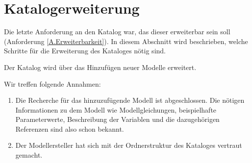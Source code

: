 \section{Katalogerweiterung}
\label{Ch:Ergebnisse:Sec:Erweiterung}
Die letzte Anforderung an den Katalog war, das dieser erweiterbar sein soll (Anforderung \ref{A.Erweiterbarkeit}). In diesem Abschnitt wird beschrieben, welche Schritte für die Erweiterung des Kataloges nötig sind. 

Der Katalog wird über das Hinzufügen neuer Modelle erweitert.

Wir treffen folgende Annahmen:
\begin{enumerate}
	\item Die Recherche für das hinzuzufügende Modell ist abgeschlossen. Die nötigen Informationen zu dem Modell wie Modellgleichungen, beispielhafte Parameterwerte, Beschreibung der Variablen und die dazugehörigen Referenzen sind also schon bekannt.
	\item Der Modellersteller hat sich mit der Ordnerstruktur des Kataloges vertraut gemacht.
\end{enumerate}

